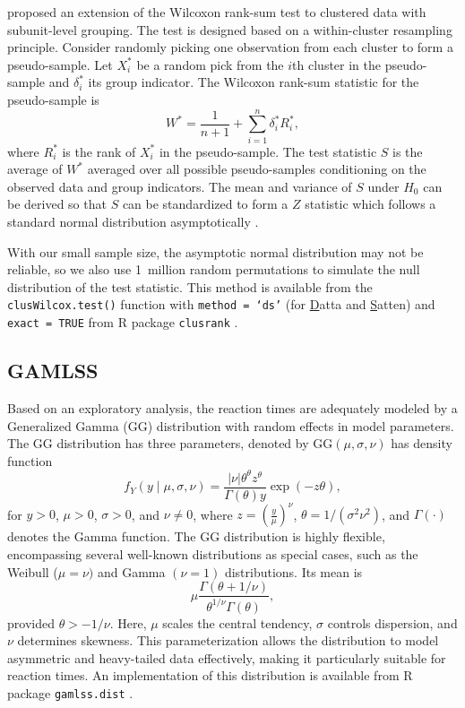 \documentclass[12pt, letterpaper]{article}
\begin{document}
\citet{datta2005rank} proposed an extension of the Wilcoxon rank-sum test to
clustered data with subunit-level grouping. The test is designed based on a
within-cluster resampling principle. Consider randomly picking one observation
from each cluster to form a pseudo-sample. Let $X_i^*$ be a random pick from the
$i$th cluster in the pseudo-sample and $\delta_i^*$ its group indicator. The
Wilcoxon rank-sum statistic for the pseudo-sample is
\[
W^* = \frac{1}{n + 1} + \sum_{i=1}^{n} \delta_{i}^{*} R_{i}^{*},
\]
where $R_{i}^{*}$ is the rank of $X_{i}^{*}$ in the pseudo-sample.
The test statistic $S$ is the average of $W^*$ averaged over all possible
pseudo-samples conditioning on the observed data and group indicators.
The mean and variance of $S$ under $H_0$ can be derived so that $S$ can be
standardized to form a $Z$ statistic which follows a standard normal distribution
asymptotically \citep[p.910]{datta2005rank}.


With our small sample size, the asymptotic normal distribution may not be
reliable, so we also use 1~million random permutations to simulate the null 
distribution of the test statistic.
This method is available from the \texttt{clusWilcox.test()} function
with \texttt{method = `ds'} (for \underline{D}atta and \underline{S}atten) and 
\texttt{exact = TRUE} from R package
\texttt{clusrank} \citep{jiang2020wilcoxon}. 


\subsection{GAMLSS}\label{sec:gamlss}

Based on an exploratory analysis, the reaction times are adequately
modeled by a Generalized Gamma (GG) distribution with random effects in
model parameters. The GG distribution has three parameters, denoted by
$\text{GG}(\mu, \sigma, \nu)$ has density function
\[
f_Y(y \mid \mu, \sigma, \nu) = 
\frac{|\nu| \theta^\theta z^{\theta}}{\Gamma(\theta) y} 
\exp\left(-z \theta\right),
\]
for $y > 0$, $\mu > 0$, $\sigma > 0$, and $\nu \neq 0$,
where $z = \left(\frac{y}{\mu}\right)^\nu$,
$\theta = 1 / (\sigma^2 \nu^2)$, and
$\Gamma(\cdot)$ denotes the Gamma function.
The GG distribution is highly flexible, encompassing several  
well-known distributions as special cases, such as the
Weibull ($\mu = \nu)$ and  Gamma $(\nu = 1)$ distributions.
Its mean is
\[
  \mu \frac{\Gamma(\theta + 1 / \nu)}
  {\theta^{1 / \nu} \Gamma(\theta)},
\]
provided $\theta > -1 / \nu$. Here,
$\mu$ scales the central tendency, $\sigma$ controls 
dispersion, and $\nu$ determines skewness. This parameterization allows 
the distribution to model asymmetric and heavy-tailed data effectively, making 
it particularly suitable for reaction times.
An implementation of this distribution is available from R package
\texttt{gamlss.dist} \citep{rigby2019distributions}.
\end{document}
